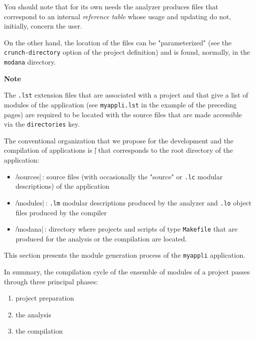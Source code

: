 You should note that for its own needs the analyzer produces files that correspond to an internal {\em reference table} whose usage and updating do not, initially, concern the user.

On the other hand, the location of the files can be "parameterized" (see the {\tt crunch-directory} option of the project definition) and is found, normally, in the {\tt modana} directory. 

\begin{Side}{\bf Note}

The {\tt .lst} extension files 
that are associated with a project and that give a list of modules of the application (see {\tt myappli.lst} in the example of the preceding pages) are required to be located with the source files that are made accessible via the {\tt directories} key. 
\end{Side}




The conventional organization that we propose for the development and the compilation of applications is \|<root-dir>| that corresponds to the root directory of the application:
\begin{itemize}
\item \|<root-dir>/sources|\,: source files (with occasionally the "source" or {\tt .lc} modular descriptions) of the application
\item \|<root-dir>/modules|\,: {\tt .lm} modular descriptions produced by the analyzer and {\tt .lo} object files produced by the compiler
\item \|<root-dir>/modana|\,: directory where projects and scripts of type {\tt Makefile} that are produced for the analysis or the compilation are located.
\end{itemize}


This section presents the module generation process of the {\tt myappli} application.

In summary, the compilation cycle of the ensemble of modules of a project passes through three principal phases:
\begin{enumerate}
\item project preparation
\item the analysis
\item the compilation
\end{enumerate}

